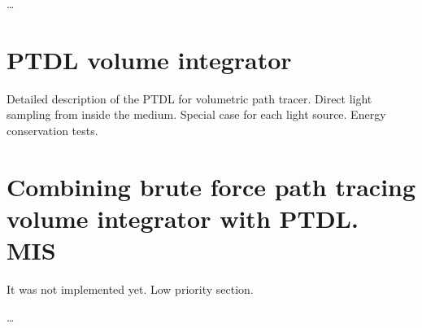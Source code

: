 \ldots


\section{PTDL volume integrator}

Detailed description of the PTDL for volumetric path tracer.
Direct light sampling from inside the medium. Special case for each light
source. Energy conservation tests.


\section{Combining brute force path tracing volume integrator with PTDL. MIS}
It was not implemented yet. Low priority section.

\ldots